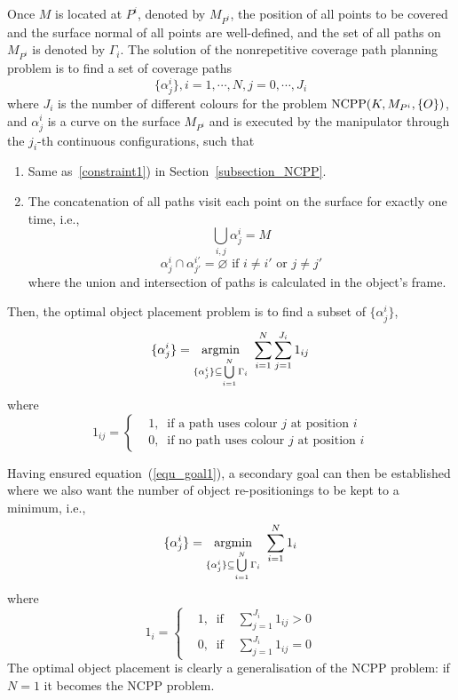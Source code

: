 \documentclass[letterpaper,journal]{IEEEtran}
\begin{document}
Once $M$ is located at $P^i$, denoted by $M_{P^i}$, the position of all points to be covered and the surface normal of all points are well-defined, and the set of all paths on $M_{P^i}$ is denoted by $\Gamma_i$. 
The solution of the nonrepetitive coverage path planning problem is to find a set of coverage paths
\begin{equation}
\{\alpha_j^i\}, i = 1, \cdots, N, j = 0, \cdots, J_i 
\end{equation}
where $J_i$ is the number of different colours for the problem ${\rm NCPP}(K, M_{P^i}, \{O\})$, and $\alpha_j^i$ is a curve on the surface $M_{P^i}$ and is executed by the manipulator through the $j_i$-th continuous configurations, such that
\begin{enumerate}
\item Same as~\ref{constraint1}) in Section~\ref{subsection_NCPP}.
\item The concatenation of all paths visit each point on the surface for exactly one time, i.e., \label{constraint2}
\begin{equation}
\bigcup\limits_{i, j} \alpha_j^i = M
\end{equation}
\begin{equation}
\alpha_j^i\cap \alpha_{j'}^{i'} = \varnothing\mbox{ if }i \neq i'\mbox{ or }j \neq j'
\end{equation}
where the union and intersection of paths is calculated in the object's frame. 
\end{enumerate} 
Then, the optimal object placement problem is to find a subset of $\{\alpha^i_j\}$, 
\begin{equation}\label{equ_goal1}
\{\alpha_j^i\} = \mathop{{\rm argmin}}\limits_{\{\alpha_j^i\}\subseteq \bigcup\limits_{i = 1}^N \Gamma_i}~\sum\limits_{i=1}^N\sum\limits_{j = 1}^{J_i} 1_{ij}
\end{equation}
where 
\begin{equation}
1_{ij} = \left\{
\begin{aligned}
&1,\ \mbox{ if a path uses colour }j \mbox{ at position }i\\
&0,\ \mbox{ if no path uses colour }j \mbox{ at position }i 
\end{aligned}
\right.
\end{equation}

Having ensured equation~(\ref{equ_goal1}), a secondary goal can then be established  where we also want the number of object re-positionings to be kept to a minimum, i.e., 
\begin{equation}
\{\alpha_j^i\} = \mathop{{\rm argmin}}\limits_{\{\alpha_j^i\}\subseteq \bigcup\limits_{i = 1}^N \Gamma_i}~\sum\limits_{i=1}^N 1_{i}
\end{equation}
where
\begin{equation}
1_i = \left\{
\begin{aligned}
&1,\ \mbox{ if } &\sum\limits_{j = 1}^{J_i}1_{ij} > 0\\
&0,\ \mbox{ if } &\sum\limits_{j = 1}^{J_i}1_{ij} = 0
\end{aligned}
\right.
\end{equation}
The optimal object placement is clearly a generalisation of the NCPP problem: if $N = 1$ it becomes the NCPP problem. 
\end{document}

